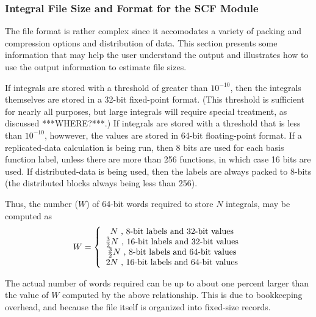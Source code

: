 


\subsubsection{Integral File Size and Format for the SCF Module}

The file format is rather complex since it accomodates a variety of
packing and compression options and distribution of data.  This section 
presents some information that may help the user understand the output 
and illustrates how to use the output information to estimate file sizes.

If integrals are stored with a threshold of greater than $10^{-10}$,
then the integrals
themselves are stored in a 32-bit fixed-point format. (This threshold
is sufficient for nearly all purposes, but large integrals will
require special treatment, as discussed ***WHERE?***.)  
If integrals are stored with a threshold that is less than $10^{-10}$,
howwever, the values are stored in 64-bit floating-point format.  
If a replicated-data calculation is being run,
then 8 bits are used for each basis function label, unless there are
more than 256 functions, in which case 16 bits are used.  If
distributed-data is being used, then the labels are always packed to
8-bits (the distributed blocks always being less than 256).

Thus, the number ($W$) of 64-bit words required to store $N$ integrals,
may be computed as
\begin{displaymath}
  W = \left\{ \\
      \begin{array}{c}
        N \mbox{ , 8-bit labels and 32-bit values} \\
        \frac{3}{2}N \mbox{ , 16-bit labels and 32-bit values} \\
        \frac{3}{2}N \mbox{ , 8-bit labels and 64-bit values} \\
        2N \mbox{ , 16-bit labels and 64-bit values} 
      \end{array}
      \right.
\end{displaymath}

The actual number of words required can be up to about one percent larger 
than the value of $W$ computed by the above relationship.  This is due 
to bookkeeping overhead, and because the file itself is organized into
fixed-size records.


